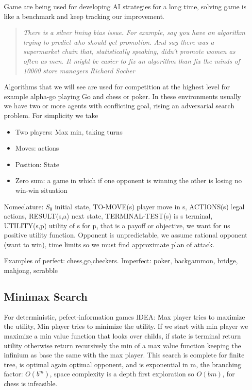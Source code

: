\documentclass[12pt]{book}
\begin{document}
Game are being used for developing AI strategies for a long time, solving game is like a benchmark and keep tracking our improvement.

\begin{quote}
\textit{There is a silver lining bias issue. For example, say you have an algorithm trying to predict who should get promotion. And say there was a supermarket chain that, statistically speaking, didn't promote women as often as men. It might be easier to fix an algorithm than fix the minds of 10000 store managers}
	\newline
	\textit{Richard Socher}
\end{quote}

Algorithms that we will see are used for competition at the highest level for example alpha-go playing Go and chess or poker.
In these environments usually we have two or more agents with conflicting goal, rising an adversarial search problem.
\newline
For simplicity we take
\begin{itemize}
	\item Two players: Max min, taking turns
	\item Moves: actions
	\item Position: State
	\item Zero sum: a game in which if one opponent is winning the other is losing no win-win situation
\end{itemize}

Nomeclature: $S_0$ initial state, TO-MOVE(s) player move in s, ACTIONS(s) legal actions, RESULT(s,a) next state, TERMINAL-TEST(s) is s terminal, UTILITY(s,p) utility of s for p, that is a payoff or objective, we want for us positive utility function.
Opponent is unpredictable, we assume rational opponent (want to win), time limits so we must find approximate plan of attack.

Examples of perfect: chess,go,checkers. 
\newline
Imperfect: poker, backgammon, bridge, mahjong, scrabble

\subsection{Minimax Search}
For deterministic, pefect-information games
IDEA: Max player tries to maximize the utility, Min player tries to minimize the utility.
If we start with min player we maximize a min value function that looks over childs, if state is terminal return utility otherwise return recursively the min of a max value function keeping the infinium as base the same with the max player.
\newline
This search is complete for finite tree, is optimal again optimal opponent, and is exponential in m, the branching factor: $O(b^m)$, space complexity is a depth first exploration so $O(bm)$, for chess is infeasible.
\end{document}
